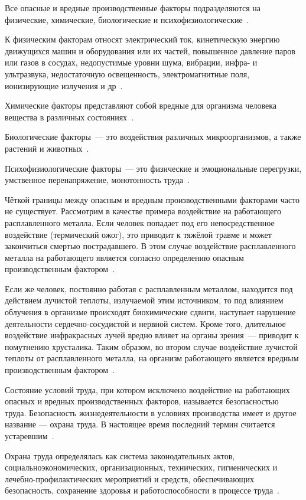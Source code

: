 Все опасные и вредные производственные факторы подразделяются на физические, химические, биологические и психофизиологические~\cite{MSTUCA_OT}.

К физическим факторам относят электрический ток, кинетическую энергию движущихся машин и оборудования или их частей, повышенное давление паров или газов в сосудах, недопустимые уровни шума, вибрации, инфра- и ультразвука, недостаточную освещенность, электромагнитные поля, ионизирующие излучения и др~\cite{MSTUCA_OT}.

Химические факторы представляют собой вредные для организма человека вещества в различных состояниях~\cite{MSTUCA_OT}.

Биологические факторы~--- это воздействия различных микроорганизмов, а также растений и животных~\cite{MSTUCA_OT}.

Психофизиологические факторы~--- это физические и эмоциональные перегрузки, умственное перенапряжение, монотонность труда~\cite{MSTUCA_OT}.

Чёткой границы между опасным и вредным производственными факторами часто не существует. Рассмотрим в качестве примера воздействие на работающего расплавленного металла. Если человек попадает под его непосредственное воздействие (термический ожог), это приводит к тяжёлой травме и может закончиться смертью пострадавшего. В этом случае воздействие расплавленного металла на работающего
является согласно определению опасным производственным фактором~\cite{MSTUCA_OT}.

Если же человек, постоянно работая с расплавленным металлом, находится под действием лучистой теплоты, излучаемой этим источником, то под влиянием облучения в организме происходят биохимические сдвиги, наступает нарушение деятельности сердечно-сосудистой и нервной систем. Кроме того, длительное воздействие инфракрасных лучей вредно влияет на органы зрения~--- приводит к помутнению хрусталика. Таким образом, во втором случае воздействие лучистой теплоты от расплавленного металла, на организм работающего является вредным производственным фактором~\cite{MSTUCA_OT}.

Состояние условий труда, при котором исключено воздействие на работающих опасных и вредных производственных факторов, называется безопасностью труда. Безопасность жизнедеятельности в условиях производства имеет и другое название — охрана труда. В настоящее время последний термин считается устаревшим~\cite{MSTUCA_OT}.

Охрана труда определялась как система законодательных актов, социальноэкономических, организационных, технических, гигиенических и лечебно-профилактических мероприятий и средств, обеспечивающих безопасность, сохранение здоровья и работоспособности в процессе труда~\cite{MSTUCA_OT}.


